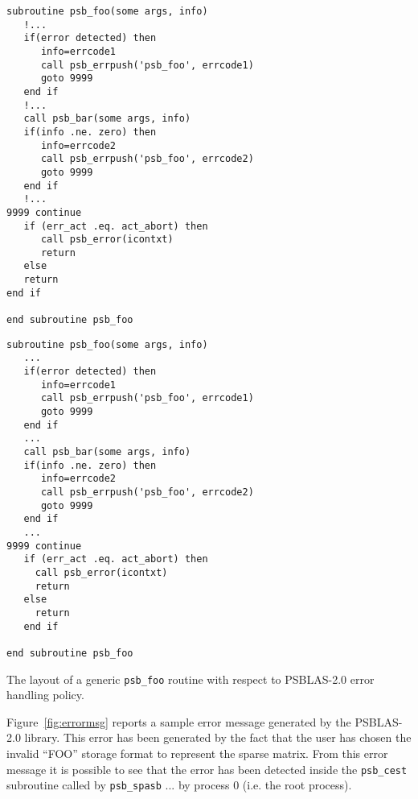\begin{listing}[h!]
\ifpdf
\begin{verbatim}
subroutine psb_foo(some args, info)
   !...
   if(error detected) then
      info=errcode1
      call psb_errpush('psb_foo', errcode1)
      goto 9999
   end if
   !...
   call psb_bar(some args, info)
   if(info .ne. zero) then
      info=errcode2
      call psb_errpush('psb_foo', errcode2)
      goto 9999
   end if
   !...
9999 continue
   if (err_act .eq. act_abort) then
      call psb_error(icontxt)
      return
   else
   return
end if

end subroutine psb_foo
\end{verbatim}
\else
  \begin{Sbox}
    \begin{minipage}[tl]{0.95\textwidth}
\small
\begin{lstlisting}
subroutine psb_foo(some args, info)
   ...
   if(error detected) then
      info=errcode1
      call psb_errpush('psb_foo', errcode1)
      goto 9999
   end if
   ...
   call psb_bar(some args, info)
   if(info .ne. zero) then
      info=errcode2
      call psb_errpush('psb_foo', errcode2)
      goto 9999
   end if
   ...
9999 continue
   if (err_act .eq. act_abort) then
     call psb_error(icontxt)
     return
   else
     return
   end if

end subroutine psb_foo
\end{lstlisting}
    \end{minipage}
  \end{Sbox}
  \setlength{\fboxsep}{8pt}
  \begin{center}
    \fbox{\TheSbox}
  \end{center}
\fi
  \caption{\label{fig:routerr}The layout of a generic \texttt{psb\_foo}
  routine with respect to PSBLAS-2.0 error handling policy.}
\end{listing}




Figure~\ref{fig:errormsg} reports a sample error message generated by
the PSBLAS-2.0 library. This error has been generated by the fact that
the user has chosen the invalid ``FOO'' storage format to represent
the sparse matrix. From this error message it is possible to see that
the error has been detected inside the \verb|psb_cest| subroutine
called by \verb|psb_spasb| ... by process 0 (i.e. the root process).


